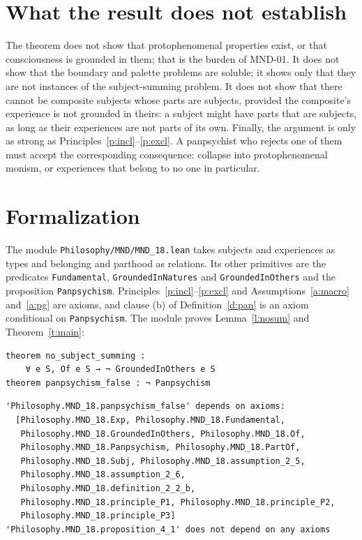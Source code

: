 \documentclass{situationist-preprint}
\begin{document}
\section{What the result does not establish}

The theorem does not show that protophenomenal properties exist, or that consciousness is grounded in them; that is the burden of MND-01. It does not show that the boundary and palette problems are soluble; it shows only that they are not instances of the subject-summing problem. It does not show that there cannot be composite subjects whose parts are subjects, provided the composite's experience is not grounded in theirs: a subject might have parts that are subjects, as long as their experiences are not parts of its own. Finally, the argument is only as strong as Principles~\ref{p:incl}--\ref{p:excl}. A panpsychist who rejects one of them must accept the corresponding consequence: collapse into protophenomenal monism, or experiences that belong to no one in particular.

\section{Formalization}\label{s:formal}

The module \nolinkurl{Philosophy/MND/MND_18.lean} takes subjects and experiences as types and belonging and parthood as relations. Its other primitives are the predicates \texttt{Fundamental}, \texttt{GroundedInNatures} and \texttt{GroundedInOthers} and the proposition \texttt{Panpsychism}. Principles~\ref{p:incl}--\ref{p:excl} and Assumptions~\ref{a:macro} and~\ref{a:pg} are axioms, and clause (b) of Definition~\ref{d:pan} is an axiom conditional on \texttt{Panpsychism}. The module proves Lemma~\ref{l:nosum} and Theorem~\ref{t:main}:

\begin{lstlisting}
theorem no_subject_summing :
    ∀ e S, Of e S → ¬ GroundedInOthers e S
theorem panpsychism_false : ¬ Panpsychism
\end{lstlisting}

\begin{lstlisting}
'Philosophy.MND_18.panpsychism_false' depends on axioms:
  [Philosophy.MND_18.Exp, Philosophy.MND_18.Fundamental,
   Philosophy.MND_18.GroundedInOthers, Philosophy.MND_18.Of,
   Philosophy.MND_18.Panpsychism, Philosophy.MND_18.PartOf,
   Philosophy.MND_18.Subj, Philosophy.MND_18.assumption_2_5,
   Philosophy.MND_18.assumption_2_6,
   Philosophy.MND_18.definition_2_2_b,
   Philosophy.MND_18.principle_P1, Philosophy.MND_18.principle_P2,
   Philosophy.MND_18.principle_P3]
'Philosophy.MND_18.proposition_4_1' does not depend on any axioms
\end{lstlisting}
\end{document}
